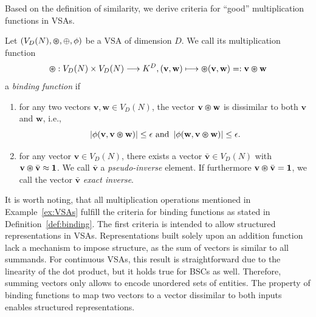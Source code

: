 Based on the definition of similarity, we derive criteria for \enquote{good} multiplication functions in \acp{VSA}.
\begin{defn}
	\label{def:binding}
	Let $(V_{D}(N), \varoast, \oplus, \phi)$ be a \acrfull{VSA} of dimension $D$. We call its multiplication function
	\[\varoast: V_{D}(N) \times V_{D}(N) \longrightarrow K^{D}, ( \mathbf{v}, \mathbf{w}) \longmapsto \varoast( \mathbf{v}, \mathbf{w}) =: \mathbf{v}\varoast \mathbf{w}\]
	a \emph{binding function} if
	\begin{enumerate}
		\item for any two vectors $ \mathbf{v}, \mathbf{w} \in V_{D}(N)$, the vector $ \mathbf{v} \varoast \mathbf{w}$ is dissimilar to both $ \mathbf{v}$ and $ \mathbf{w}$, i.e.,
		\[
		\left| \phi( \mathbf{v}, \mathbf{v} \varoast \mathbf{w}) \right| \leq \epsilon \textrm{ and } \left| \phi( \mathbf{w}, \mathbf{v} \varoast \mathbf{w}) \right| \leq \epsilon.
		\]
		\item for any vector $ \mathbf{v} \in V_{D}(N)$, there exists a vector $\bar{\mathbf{v}} \in V_{D}(N)$ with $ \mathbf{v} \varoast \bar{\mathbf{v}} \approx \mathbf{1}$. We call $\bar{\mathbf{v}}$ a \emph{pseudo-inverse} element.
		If furthermore $ \mathbf{v} \varoast \bar{\mathbf{v}} = \mathbf{1}$, we call the vector $\bar{\mathbf{v}}$ \emph{exact inverse}.
	\end{enumerate}
\end{defn}
It is worth noting, that all multiplication operations mentioned in Example~\ref{ex:VSAs} fulfill the criteria for binding functions as stated in Definition~\ref{def:binding}.
The first criteria is intended to allow structured representations in \acp{VSA}.
Representations built solely upon an addition function lack a mechanism to impose structure, as the sum of vectors is similar to all summands.
For continuous \acp{VSA}, this result is straightforward due to the linearity of the dot product, but it holds true for \acp{BSC} as well.
Therefore, summing vectors only allows to encode unordered sets of entities.
The property of binding functions to map two vectors to a vector dissimilar to both inputs enables structured representations.

